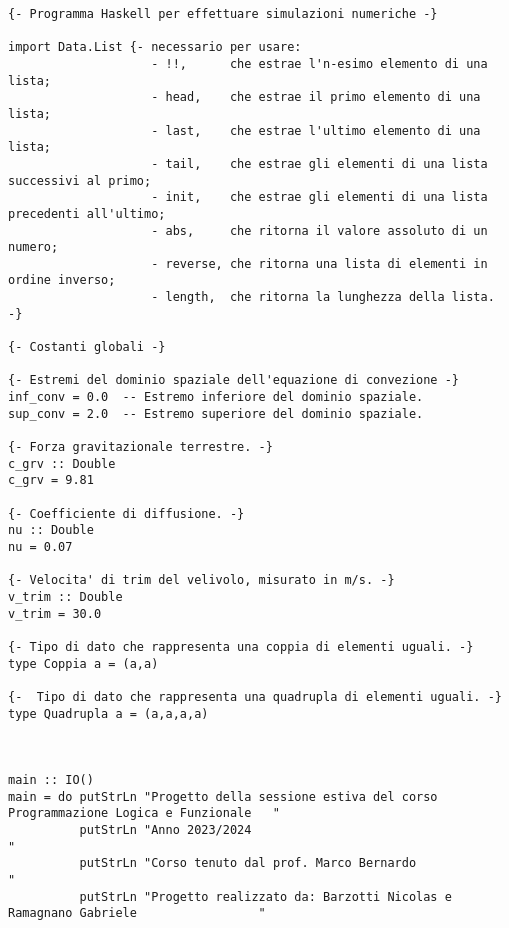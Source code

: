
\scriptsize
\begin{verbatim}
   


{- Programma Haskell per effettuare simulazioni numeriche -}

import Data.List {- necessario per usare: 
                    - !!,      che estrae l'n-esimo elemento di una lista;
                    - head,    che estrae il primo elemento di una lista;
                    - last,    che estrae l'ultimo elemento di una lista; 
                    - tail,    che estrae gli elementi di una lista successivi al primo;
                    - init,    che estrae gli elementi di una lista precedenti all'ultimo;
                    - abs,     che ritorna il valore assoluto di un numero;
                    - reverse, che ritorna una lista di elementi in ordine inverso;
                    - length,  che ritorna la lunghezza della lista. -}

{- Costanti globali -}

{- Estremi del dominio spaziale dell'equazione di convezione -}
inf_conv = 0.0  -- Estremo inferiore del dominio spaziale.
sup_conv = 2.0  -- Estremo superiore del dominio spaziale.

{- Forza gravitazionale terrestre. -}
c_grv :: Double
c_grv = 9.81 

{- Coefficiente di diffusione. -}
nu :: Double
nu = 0.07  

{- Velocita' di trim del velivolo, misurato in m/s. -}
v_trim :: Double
v_trim = 30.0     

{- Tipo di dato che rappresenta una coppia di elementi uguali. -}
type Coppia a = (a,a)

{-  Tipo di dato che rappresenta una quadrupla di elementi uguali. -}
type Quadrupla a = (a,a,a,a)



main :: IO()
main = do putStrLn "Progetto della sessione estiva del corso Programmazione Logica e Funzionale   "
          putStrLn "Anno 2023/2024                                                                "
          putStrLn "Corso tenuto dal prof. Marco Bernardo                                         "
          putStrLn "Progetto realizzato da: Barzotti Nicolas e Ramagnano Gabriele                 "
          

\end{verbatim}
